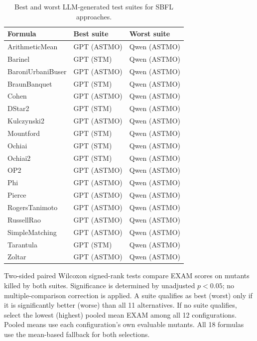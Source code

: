 \begin{table}[t]
\centering
\caption{Best and worst LLM-generated test suites for SBFL approaches.}
\label{tab:rq3bw-selection}
\begin{tabular}{lll}
\toprule
Formula & Best suite & Worst suite \\
\midrule
ArithmeticMean & GPT (ASTMO) & Qwen (ASTMO) \\
Barinel & GPT (STM) & Qwen (ASTMO) \\
BaroniUrbaniBuser & GPT (ASTMO) & Qwen (ASTMO) \\
BraunBanquet & GPT (STM) & Qwen (ASTMO) \\
Cohen & GPT (ASTMO) & Qwen (ASTMO) \\
DStar2 & GPT (STM) & Qwen (ASTMO) \\
Kulczynski2 & GPT (ASTMO) & Qwen (ASTMO) \\
Mountford & GPT (STM) & Qwen (ASTMO) \\
Ochiai & GPT (STM) & Qwen (ASTMO) \\
Ochiai2 & GPT (STM) & Qwen (ASTMO) \\
OP2 & GPT (ASTMO) & Qwen (ASTMO) \\
Phi & GPT (ASTMO) & Qwen (ASTMO) \\
Pierce & GPT (ASTMO) & Qwen (ASTMO) \\
RogersTanimoto & GPT (ASTMO) & Qwen (ASTMO) \\
RussellRao & GPT (ASTMO) & Qwen (ASTMO) \\
SimpleMatching & GPT (ASTMO) & Qwen (ASTMO) \\
Tarantula & GPT (STM) & Qwen (ASTMO) \\
Zoltar & GPT (ASTMO) & Qwen (ASTMO) \\
\bottomrule
\end{tabular}
\par\smallskip
\begin{minipage}{\linewidth}\footnotesize Two-sided paired Wilcoxon signed-rank tests compare EXAM scores on mutants killed by both suites. Significance is determined by unadjusted $p<0.05$; no multiple-comparison correction is applied. A suite qualifies as best (worst) only if it is significantly better (worse) than all 11 alternatives. If no suite qualifies, select the lowest (highest) pooled mean EXAM among all 12 configurations. Pooled means use each configuration's own evaluable mutants. All 18 formulas use the mean-based fallback for both selections.
\end{minipage}
\end{table}
